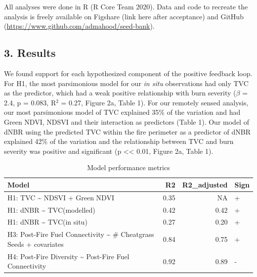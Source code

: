 \documentclass[
  12pt,
]{article}
\begin{document}
All analyses were done in R (R Core Team 2020). Data and code to
recreate the analysis is freely available on Figshare (link here after
acceptance) and GitHub
(\url{https://www.github.com/admahood/seed-bank}).

\hypertarget{results}{%
\subsection{3. Results}\label{results}}

We found support for each hypothesized component of the positive
feedback loop. For H1, the most parsimonious model for our \emph{in
situ} observations had only TVC as the predictor, which had a weak
positive relationship with burn severity (\(\beta\) = 2.4, p = 0.083,
R\(^2\) = 0.27, Figure 2a, Table 1). For our remotely sensed analysis,
our most parsimonious model of TVC explained 35\% of the variation and
had Green NDVI, NDSVI and their interaction as predictors (Table 1). Our
model of dNBR using the predicted TVC within the fire perimeter as a
predictor of dNBR explained 42\% of the variation and the relationship
between TVC and burn severity was positive and significant (p
\textless\textless{} 0.01, Figure 2a, Table 1).

\begin{table}

\caption{\label{tab:unnamed-chunk-1}Model performance metrics}
\centering
\fontsize{8}{10}\selectfont
\begin{tabular}[t]{lrrl}
\toprule
Model & R2 & R2\_adjusted & Sign\\
\midrule
H1: TVC \textasciitilde{} NDSVI + Green NDVI & 0.35 & NA & +\\
H1: dNBR \textasciitilde{} TVC(modelled) & 0.42 & 0.42 & +\\
H1: dNBR \textasciitilde{} TVC(in situ) & 0.27 & 0.20 & +\\
H3: Post-Fire Fuel Connectivity \textasciitilde{} \# Cheatgrass Seeds + covariates & 0.84 & 0.75 & +\\
H4: Post-Fire Diversity \textasciitilde{} Post-Fire Fuel Connectivity & 0.92 & 0.89 & -\\
\bottomrule
\end{tabular}
\end{table}
\end{document}
